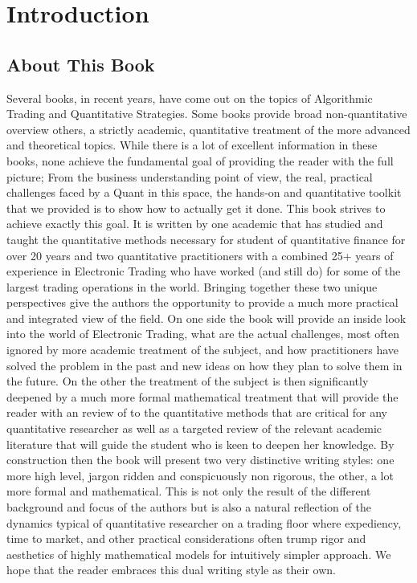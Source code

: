\chapter{Introduction}
\section{About This Book}

Several books, in recent years, have come out  on the topics of Algorithmic Trading and Quantitative Strategies. Some books provide broad non-quantitative overview others, a strictly academic, quantitative treatment of the more advanced and theoretical topics. While there is a lot of excellent information in these books, none achieve the fundamental goal of providing the reader with the full picture; From the business understanding point of view, the real, practical challenges faced by a Quant in this space, the hands-on and quantitative toolkit that we provided is to show how to actually get it done. This book strives to achieve exactly this goal. It is written by one academic that has studied and taught the quantitative methods necessary for student of quantitative finance for over 20 years and two quantitative practitioners with a combined 25+ years of experience in Electronic Trading who have worked (and still do) for some of the largest trading operations in the world. Bringing together these two unique perspectives give the authors the opportunity to provide a much more practical and integrated view of the field. On one side the book will provide an inside look into the world of Electronic Trading, what are the actual challenges, most often ignored by more academic treatment of the subject, and how practitioners have solved the problem in the past and new ideas on how they plan to solve them in the future. On the other the treatment of the subject is then significantly deepened by a much more formal mathematical treatment that will provide the reader with an review of to the quantitative methods that are critical for any quantitative researcher as well as a targeted review of the relevant academic literature that will guide the student who is keen to deepen her knowledge. By construction then the book will present two very distinctive writing styles: one more high level, jargon ridden and conspicuously non rigorous, the other, a lot more formal and mathematical. This is not only the result of the different  background and focus of the authors but is also a natural reflection of the dynamics typical  of quantitative researcher on a trading floor where expediency, time to market, and other practical considerations often trump rigor and aesthetics of highly mathematical models for intuitively simpler approach. We hope that the reader embraces this dual writing style as their own.


